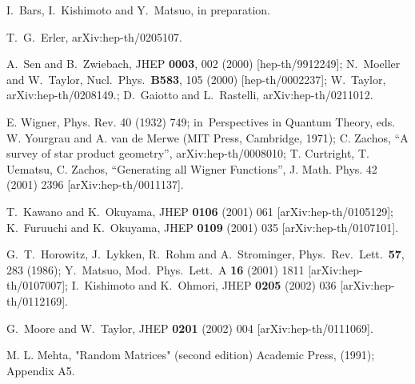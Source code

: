 \documentclass[a4paper,aps,preprint,nofootinbib,eqsecnum]{revtex4}
\begin{document}
\begin{thebibliography}{99}
 {\small I.~Bars, I.~Kishimoto and Y.~Matsuo, in preparation. }

 {\small T.~G.~Erler,
arXiv:hep-th/0205107. %
}

 {\small %
A.\ Sen and B.\ Zwiebach, %
JHEP \textbf{0003}, 002 (2000) [hep-th/9912249];\newline
%
N.\ Moeller and W.\ Taylor,
Nucl.\ Phys.\ \textbf{B583}, 105 (2000) [hep-th/0002237];\newline
W.~Taylor, %
arXiv:hep-th/0208149.;\newline
%
%
D.~Gaiotto and L.~Rastelli, %
arXiv:hep-th/0211012. %
}

 {\small E. Wigner, Phys. Rev. 40 (1932) 749; in\
 Perspectives in Quantum Theory, eds. W. Yourgrau and A. van de Merwe (MIT
 Press, Cambridge, 1971); C. Zachos, \textquotedblleft A survey of star
 product geometry\textquotedblright , arXiv:hep-th/0008010; T. Curtright, T.
 Uematsu, C. Zachos, \textquotedblleft Generating all Wigner
 Functions\textquotedblright , J. Math. Phys. 42 (2001) 2396
 [arXiv:hep-th/0011137].}

 {\small T.~Kawano and K.~Okuyama,%
JHEP \textbf{0106} (2001) 061 [arXiv:hep-th/0105129];\newline
K.~Furuuchi and K.~Okuyama, %
JHEP \textbf{0109} (2001) 035 [arXiv:hep-th/0107101].
}

 {\small G.~T.~Horowitz, J.~Lykken, R.~Rohm and A.~Strominger,
Phys.\ Rev.\ Lett.\ \textbf{57}, 283 (1986);\newline
Y.~Matsuo,
Mod.\ Phys.\ Lett.\ A \textbf{16} (2001) 1811 [arXiv:hep-th/0107007];\newline
I.~Kishimoto and K.~Ohmori,
JHEP \textbf{0205} (2002) 036 [arXiv:hep-th/0112169]. }

 {\small G.~Moore and W.~Taylor,
JHEP \textbf{0201} (2002) 004 [arXiv:hep-th/0111069].
}

 {\small M. L. Mehta, "Random Matrices" (second edition)
Academic Press, (1991); Appendix A5. }
\end{thebibliography}
\end{document}
